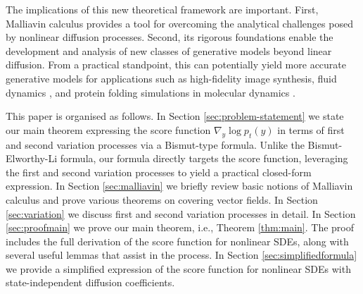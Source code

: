 \documentclass[]{interact}
\newcommand{\1}{\mathbf{1}}
\theoremstyle{plain}%
\theoremstyle{definition}
\theoremstyle{remark}
\numberwithin{equation}{section}
\begin{document}
The implications of this new theoretical framework are important. 
First, Malliavin calculus provides a tool for overcoming the analytical challenges posed by nonlinear diffusion processes. Second, its rigorous foundations 
enable the development and analysis of new classes of generative  
models beyond linear diffusion.  From a practical standpoint, 
this can potentially yield more accurate generative models for 
applications such as high-fidelity image synthesis, fluid dynamics \cite{WickMalliavin2013}, and protein folding 
simulations in molecular dynamics \cite{Abramson2024}.



This paper is organised as follows. In Section \ref{sec:problem-statement} we state our main theorem expressing the score function  \(\nabla_y \log p_t(y)\) in terms of first and second variation processes via a Bismut-type formula. Unlike the Bismut-Elworthy-Li formula, our formula directly targets the score function, leveraging the first and second variation processes to yield a practical closed-form expression.  In Section \ref{sec:malliavin} we briefly review basic notions of Malliavin calculus and prove various theorems on covering vector fields. In Section \ref{sec:variation} we discuss first and second variation processes in detail. In Section \ref{sec:proofmain}  we prove our main theorem, i.e., Theorem \ref{thm:main}. The proof includes the full derivation of the score function for nonlinear SDEs, along with several useful lemmas that assist in the process. In Section \ref{sec:simplifiedformula} we provide a simplified expression of the score function for nonlinear SDEs with state-independent diffusion coefficients. %
\end{document}
